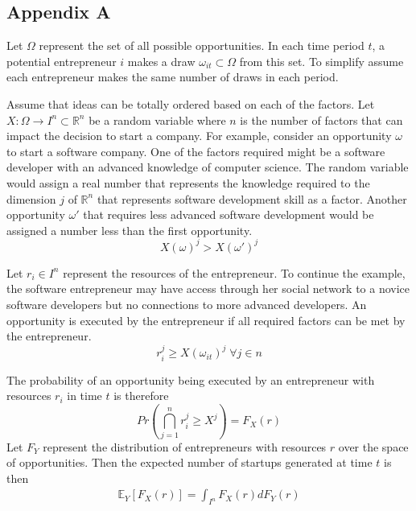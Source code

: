 \documentclass[12pt]{article}
\begin{document}
\subsection*{Appendix A}

Let $\Omega$ represent the set of all possible opportunities. In each time period $t$, a potential entrepreneur $i$ makes a draw $\omega_{it} \subset \Omega$ from this set. To simplify assume each entrepreneur makes the same number of draws in each period. 

Assume that ideas can be totally ordered based on each of the factors. Let $X:\Omega\to I^n \subset \mathbb{R}^n$ be a random variable where $n$ is the number of factors that can impact the decision to start a company. For example, consider an opportunity $\omega$ to start a software company. One of the factors required might be a software developer with an advanced knowledge of computer science. The random variable would assign a real number that represents the knowledge required to the dimension $j$ of $\mathbb{R}^n$ that represents software development skill as a factor. Another opportunity $\omega'$ that requires less advanced software development would be assigned a number less than the first opportunity. 
$$X(\omega)^j > X(\omega')^j $$

Let $r_i \in I^n$ represent the resources of the entrepreneur. To continue the example, the software entrepreneur may have access through her social network to a novice software developers but no connections to more advanced developers. An opportunity is executed by the entrepreneur if all required factors can be met by the entrepreneur. 
$$r_i^j \ge X(\omega_{it})^j \; \forall j \in n$$

\begin{comment}
We call an idea \textit{unbounded} for an individual if the idea can be executed and \textit{single bounded} on dimension $k$ if
$$\alpha_i^k = X(\omega{it})^k \wedge  \alpha_i^j > X(\omega{it})^j \; \forall j \ne k \in n$$
\end{comment}

The probability of an opportunity being executed by an entrepreneur with resources $r_i$ in time $t$ is therefore 
$$Pr\left(\bigcap _{j=1}^n  r_i^j \ge X^j\right) = F_X(r)$$
Let $F_Y$ represent the distribution of entrepreneurs with resources $r$ over the space of opportunities. Then the expected number of startups generated at time $t$ is then 
\begin{align}
\mathbb{E}_{Y}[F_X(r)]=\int_{I^n} F_X(r) dF_Y(r)
\label{eq:total}
\end{align}
\end{document}
